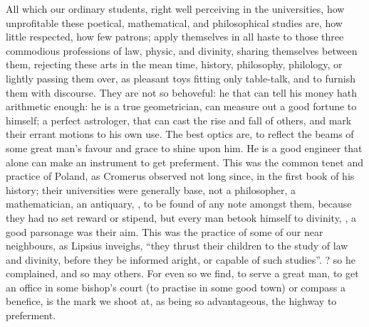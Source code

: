 
All which our ordinary students, right well perceiving in the universities, how
unprofitable these poetical, mathematical, and philosophical studies are, how
little respected, how few patrons; apply themselves in all haste to those three
commodious professions of law, physic, and divinity, sharing themselves between
them, rejecting these arts in the mean time, history,
philosophy, philology, or lightly passing them over, as pleasant toys fitting
only table-talk, and to furnish them with discourse. They are not so behoveful:
he that can tell his money hath arithmetic enough: he is a true geometrician,
can measure out a good fortune to himself; a perfect astrologer, that can cast
the rise and fall of others, and mark their errant motions to his own use. The
best optics are, to reflect the beams of some great man's favour and grace to
shine upon him. He is a good engineer that alone can make an instrument to get
preferment. This was the common tenet and practice of Poland, as Cromerus
observed not long since, in the first book of his history; their universities
were generally base, not a philosopher, a mathematician, an antiquary, \etc{},
to be found of any note amongst them, because they had no set reward or
stipend, but every man betook himself to divinity, , a good parsonage was their aim. This was the
practice of some of our near neighbours, as Lipsius
inveighs, \enquote{they thrust their children to the study of law and divinity, before
they be informed aright, or capable of such studies}. ?
so he complained, and so may others. For even so we find, to serve a great man,
to get an office in some bishop's court (to practise in some good town) or
compass a benefice, is the mark we shoot at, as being so advantageous, the
highway to preferment.

